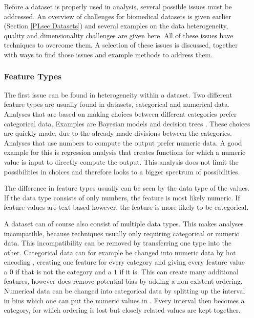 \documentclass[10pt,a4paper]{report}
\begin{document}
	Before a dataset is properly used in analysis, several possible issues must be addressed. An overview of challenges for biomedical datasets is given earlier (Section \ref{PLsec:Datasets}) and several examples on the data heterogeneity, quality and dimensionality challenges are given here. All of these issues have techniques to overcome them. A selection of these issues is discussed, together with ways to find those issues and example methods to address them.
	
	\subsubsection{Feature Types}
	\label{DEsubsec:FeatureTypes}
	
	The first issue can be found in heterogeneity within a dataset. Two different feature types are usually found in datasets, categorical and numerical data. Analyses that are based on making choices between different categories prefer categorical data. Examples are Bayesian models \cite{congdon2005bayesian} and decision trees \cite{safavian1991survey}. These choices are quickly made, due to the already made divisions between the categories. Analyses that use numbers to compute the output prefer numeric data. A good example for this is regression analysis \cite{gelman2006data} that creates functions for which a numeric value is input to directly compute the output. This analysis does not limit the possibilities in choices and therefore looks to a bigger spectrum of possibilities.
		
	The difference in feature types usually can be seen by the data type of the values. If the data type consists of only numbers, the feature is most likely numeric. If feature values are text based however, the feature is more likely to be categorical.
	
	A dataset can of course also consist of multiple data types. This makes analyses incompatible, because techniques usually only requiring categorical or numeric data. This incompatibility can be removed by transferring one type into the other. Categorical data can for example be changed into numeric data by hot encoding \cite{guo2016entity}, creating one feature for every category and giving every feature value a $0$ if that is not the category and a $1$ if it is. This can create many additional features, however does remove potential bias by adding a non-existent ordering. Numerical data can be changed into categorical data by splitting up the interval in bins which one can put the numeric values in \cite{larose2014discovering}. Every interval then becomes a category, for which ordering is lost but closely related values are kept together.  
	
\end{document}
